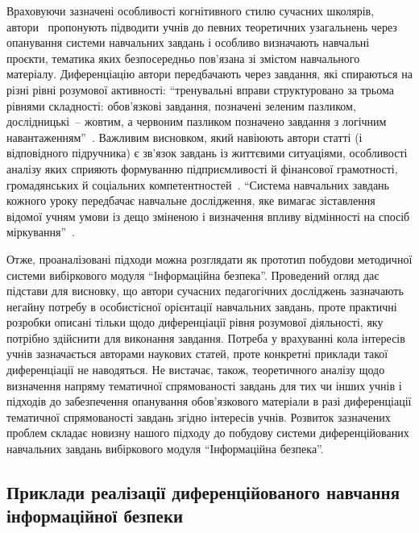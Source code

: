 Враховуючи зазначені особливості когнітивного стилю сучасних школярів, автори~\cite{Скворцова_Нєдялкова_2023} пропонують підводити учнів до певних теоретичних узагальнень через опанування системи навчальних завдань і особливо визначають навчальні проєкти, тематика яких безпосередньо пов’язана зі змістом навчального матеріалу. Диференціацію автори передбачають через завдання, які спираються на різні рівні розумової активності: ``тренувальні вправи структуровано за трьома рівнями складності: обов’язкові завдання, позначені зеленим пазликом, дослідницькі~-- жовтим, а червоним пазликом позначено завдання з логічним навантаженням''~\cite{Скворцова_Нєдялкова_2023}. Важливим висновком, який навіюють автори статті (і відповідного підручника) є зв'язок завдань із життєвими ситуаціями, особливості аналізу яких сприяють формуванню підприємливості й фінансової грамотності, громадянських й соціальних компетентностей~\cite{Скворцова_Нєдялкова_2023}. ``Система навчальних завдань кожного уроку передбачає навчальне дослідження, яке вимагає зіставлення відомої учням умови із дещо зміненою і визначення впливу відмінності на спосіб міркування''~\cite{Скворцова_Нєдялкова_2023}. 

Отже, проаналізовані підходи можна розглядати як прототип побудови методичної системи вибіркового модуля ``Інформаційна безпека''. Проведений огляд дає підстави для висновку, що автори сучасних педагогічних досліджень зазначають негайну потребу в особистісної орієнтації навчальних завдань, проте практичні розробки описані тільки щодо диференціації рівня розумової діяльності, яку потрібно здійснити для виконання завдання. Потреба у врахуванні кола інтересів учнів зазначається авторами наукових статей, проте конкретні приклади такої диференціації не наводяться. Не вистачає, також, теоретичного аналізу щодо визначення напряму тематичної спрямованості завдань для тих чи інших учнів і підходів до забезпечення опанування обов'язкового матеріали в разі диференціації тематичної спрямованості завдань згідно інтересів учнів. Розвиток зазначених проблем складає новизну нашого підходу до побудову системи диференційованих навчальних завдань вибіркового модуля ``Інформаційна безпека''.  






\subsection{Приклади реалізації диференційованого навчання інформаційної безпеки}

